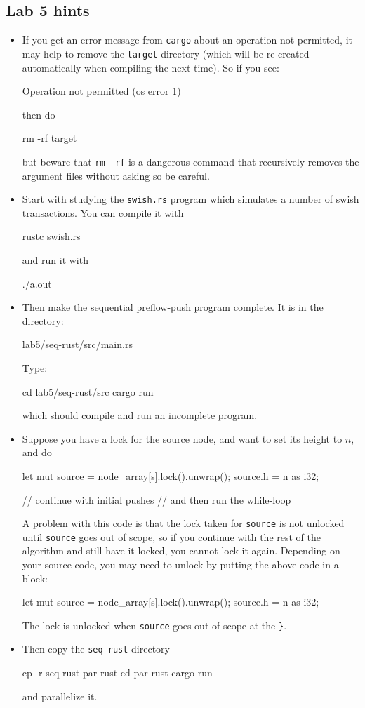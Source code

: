 \documentclass{forsete}
\begin{document}
\subsection*{Lab 5 hints}
\begin{itemize}
\item If you get an error message from \verb.cargo. about an operation not permitted, it may help
to remove the \verb.target. directory (which will be re-created automatically when compiling the
next time). So if you see:
\begin{ccode}
Operation not permitted (os error 1)
\end{ccode}
then do
\begin{ccode}
rm -rf target
\end{ccode}
but beware that \verb.rm -rf. is a dangerous command that recursively removes the argument files without asking so be
careful.
\item Start with studying the \verb!swish.rs! program which simulates a number of swish transactions. 
You can compile it with
\begin{ccode}
rustc swish.rs
\end{ccode}
and run it with
\begin{ccode}
./a.out
\end{ccode}
\item Then make the sequential preflow-push program complete. It is in the directory:
\begin{ccode}
lab5/seq-rust/src/main.rs
\end{ccode}
Type:
\begin{ccode}
cd lab5/seq-rust/src
cargo run
\end{ccode}
which should compile and run an incomplete program.

\item Suppose you have a lock for the source node, and want to set its height to $n$, and do
\begin{ccode}
let mut source = node_array[s].lock().unwrap();
source.h = n as i32;

// continue with initial pushes
// and then run the while-loop
\end{ccode}
A problem with this code is that the lock taken for \verb.source. is not unlocked until
\verb.source. goes out of scope, so if you continue with the rest of the algorithm and
still have it locked, you cannot lock it again. Depending on your source code, you may
need to unlock by putting the above code in a block:
\begin{ccode}
{
	let mut source = node_array[s].lock().unwrap();
	source.h = n as i32;
}
\end{ccode}
The lock is unlocked when \verb.source. goes out of scope at the \verb.}..

\item Then copy the \verb.seq-rust. directory
\begin{ccode}
cp -r seq-rust par-rust
cd par-rust
cargo run
\end{ccode}
and parallelize it.

\end{itemize}
\end{document}

